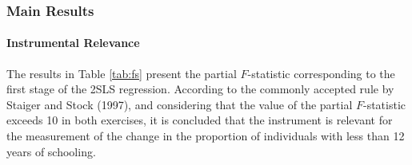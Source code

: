 \begin{frame}
    \frametitle{Main Results}
    \framesubtitle{Instrumental Relevance}

    \begin{block}

        The results in Table \ref{tab:fs} present the partial $F$-statistic corresponding to the first stage of the 2SLS regression. According to the commonly accepted rule by Staiger and Stock (1997), and considering that the value of the partial $F$-statistic exceeds 10 in both exercises, it is concluded that the instrument is relevant for the measurement of the change in the proportion of individuals with less than 12 years of schooling.    \end{block}
\end{frame}
